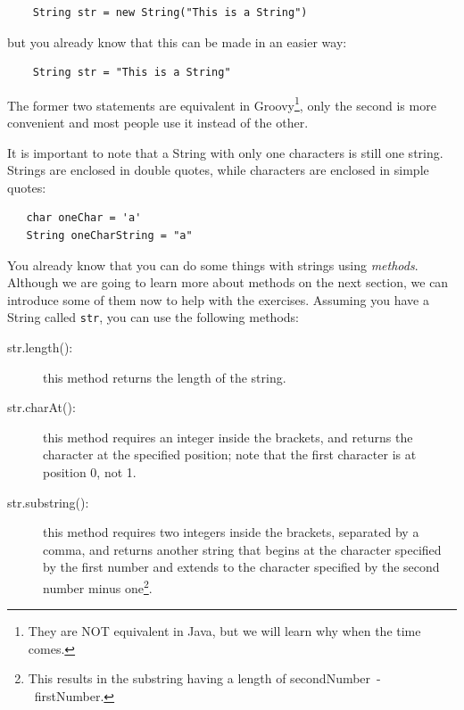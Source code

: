 \begin{verbatim}
    String str = new String("This is a String")
\end{verbatim}

but you already know that this can be made in an easier way: 

\begin{verbatim}
    String str = "This is a String"
\end{verbatim}

The former two statements are equivalent in Groovy\footnote{They are
  NOT equivalent in Java, but we will learn why when the time
  comes.}, only the second is more convenient and most people use it
instead of the other. 

It is important to note that a String with only one characters is
still one string. Strings are enclosed in double quotes, while
characters are enclosed in simple quotes:

\begin{verbatim}
   char oneChar = 'a'
   String oneCharString = "a"
\end{verbatim}

% 

You already know that you can do some things with strings using
\emph{methods}. Although we are going to learn more about methods on
the next section, we can introduce some of them now to help with the
exercises. Assuming you have a String called \verb+str+, you can use
the following methods:

\begin{description}
\item[str.length(): ] this method returns the length of the string.
\item[str.charAt(): ] this method requires an integer inside the
  brackets, and returns the character at the specified position;
  note that the first character is at position 0, not 1.
\item[str.substring(): ] this method requires two integers inside the
  brackets, separated by a comma, and returns another string that
  begins at the character specified by the first number and extends to
  the character specified by the second number minus one\footnote{This
  results in the substring having a length of
  secondNumber~-~firstNumber.}.  
\end{description}

